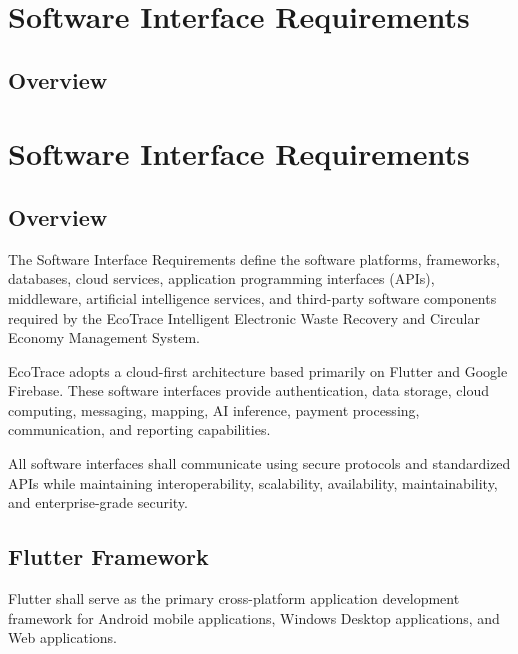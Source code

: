 
\section{Software Interface Requirements}

\subsection{Overview}
\section{Software Interface Requirements}

\subsection{Overview}

The Software Interface Requirements define the software platforms,
frameworks, databases, cloud services, application programming
interfaces (APIs), middleware, artificial intelligence services, and
third-party software components required by the EcoTrace Intelligent
Electronic Waste Recovery and Circular Economy Management System.

EcoTrace adopts a cloud-first architecture based primarily on Flutter
and Google Firebase. These software interfaces provide authentication,
data storage, cloud computing, messaging, mapping, AI inference,
payment processing, communication, and reporting capabilities.

All software interfaces shall communicate using secure protocols and
standardized APIs while maintaining interoperability, scalability,
availability, maintainability, and enterprise-grade security.


\subsection{Flutter Framework}

Flutter shall serve as the primary cross-platform application
development framework for Android mobile applications, Windows Desktop
applications, and Web applications.



